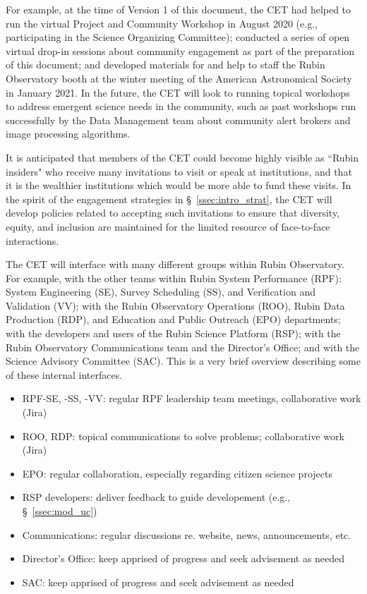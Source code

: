 \documentclass[DM,lsstdraft,toc]{lsstdoc}
\begin{document}
For example, at the time of Version 1 of this document, the CET had helped to run the virtual Project and Community Workshop in August 2020 (e.g., participating in the Science Organizing Committee); conducted a series of open virtual drop-in sessions about community engagement as part of the preparation of this document; and developed materials for and help to staff the Rubin Observatory booth at the winter meeting of the American Astronomical Society in January 2021. 
In the future, the CET will look to running topical workshops to address emergent science needs in the community, such as past workshops run successfully by the Data Management team about community alert brokers and image processing algorithms. 

It is anticipated that members of the CET could become highly visible as ``Rubin insiders" who receive many invitations to visit or speak at institutions, and that it is the wealthier institutions which would be more able to fund these visits.
In the spirit of the engagement strategies in \S~\ref{ssec:intro_strat}, the CET will develop policies related to accepting such invitations to ensure that diversity, equity, and inclusion are maintained for the limited resource of face-to-face interactions.

The CET will interface with many different groups within Rubin Observatory.
For example, with the other teams within Rubin System Performance (RPF): System Engineering (SE), Survey Scheduling (SS), and Verification and Validation (VV); with the Rubin Observatory Operations (ROO), Rubin Data Production (RDP), and Education and Public Outreach (EPO) departments; with the developers and users of the Rubin Science Platform (RSP); with the Rubin Observatory Communications team and the Director's Office; and with the Science Advisory Committee (SAC). 
This is a very brief overview describing some of these internal interfaces.
\begin{itemize}
\item RPF-SE, -SS, -VV: regular RPF leadership team meetings, collaborative work (Jira)
\item ROO, RDP: topical communications to solve problems; collaborative work (Jira)
\item EPO: regular collaboration, especially regarding citizen science projects
\item RSP developers: deliver feedback to guide developement (e.g., \S~\ref{ssec:mod_uc})
\item Communications: regular discussions re. website, news, announcements, etc.
\item Director's Office: keep apprised of progress and seek advisement as needed
\item SAC: keep apprised of progress and seek advisement as needed
\end{itemize}
\end{document}
